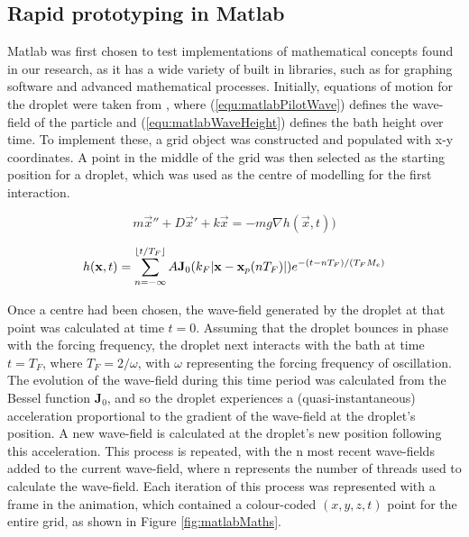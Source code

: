 \subsection{Rapid prototyping in Matlab}
Matlab was first chosen to test implementations of mathematical concepts found in our research, as it has a wide variety of built in libraries, such as for graphing software and advanced mathematical processes. Initially, equations of motion for the droplet were taken from \cite{oza2013trajectory}, where (\ref{equ:matlabPilotWave}) defines the wave-field of the particle and (\ref{equ:matlabWaveHeight}) defines the bath height over time. To implement these, a grid object was constructed and populated with x-y coordinates. A point in the middle of the grid was then selected as the starting position for a droplet, which was used as the centre of modelling for the first interaction.

\begin{equation}
m \vec{x}'' + D\vec{x}' + k\vec{x} = -mg\nabla h(\vec{x},t)
\label{equ:matlabPilotWave})
\end{equation}

\begin{equation}
h(\mathbf{x},t) = \sum_{n=-\infty}^{\lfloor t/T_F\rfloor} A \mathbf{J}_0(k_F |\mathbf{x}-\mathbf{x}_p(nT_F)|) e^{-(t-nT_F)/(T_F M_e)}
\label{equ:matlabWaveHeight}
\end{equation}

Once a centre had been chosen, the wave-field generated by the droplet at that point was calculated at time $t=0$. Assuming that the droplet bounces in phase with the forcing frequency, the droplet next interacts with the bath at time $t=T_F$, where $T_F = 2/\omega$, with $\omega$ representing the forcing frequency of oscillation. The evolution of the wave-field during this time period was calculated from the Bessel function $\mathbf{J}_0$, and so the droplet experiences a (quasi-instantaneous) acceleration proportional to the gradient of the wave-field at the droplet's position. A new wave-field is calculated at the droplet's new position following this acceleration. This process is repeated, with the n most recent wave-fields added to the current wave-field, where n represents the number of threads used to calculate the wave-field. Each iteration of this process was represented with a frame in the animation, which contained a colour-coded $(x,y,z,t)$ point for the entire grid, as shown in Figure \ref{fig:matlabMaths}.

